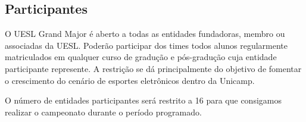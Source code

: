 \subsection{Participantes}

O UESL Grand Major é aberto a todas as entidades fundadoras, membro ou associadas da UESL. Poderão participar dos times todos alunos regularmente matriculados em qualquer curso de gradução e pós-gradução cuja entidade participante represente. A restrição se dá principalmente do objetivo de fomentar o crescimento do cenário de esportes eletrônicos dentro da Unicamp.

O número de entidades participantes será restrito a 16 para que consigamos realizar o campeonato durante o período programado.
